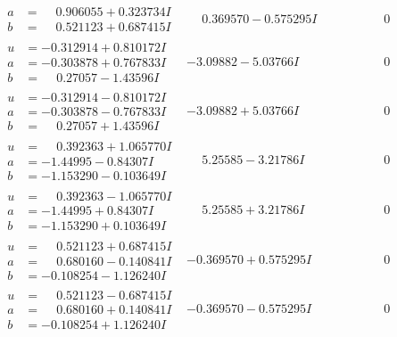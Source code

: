 \documentclass[1p]{elsarticle_modified}
\theoremstyle{definition}
\begin{document}
$$\begin{array}{c|c|c}
\begin{aligned}
a &= \phantom{-}0.906055 + 0.323734 I \\
b &= \phantom{-}0.521123 + 0.687415 I\end{aligned}
 & \phantom{-}0.369570 - 0.575295 I & \phantom{-0.000000 } 0 \\ \hline\begin{aligned}
u &= -0.312914 + 0.810172 I \\
a &= -0.303878 + 0.767833 I \\
b &= \phantom{-}0.27057 - 1.43596 I\end{aligned}
 & -3.09882 - 5.03766 I & \phantom{-0.000000 } 0 \\ \hline\begin{aligned}
u &= -0.312914 - 0.810172 I \\
a &= -0.303878 - 0.767833 I \\
b &= \phantom{-}0.27057 + 1.43596 I\end{aligned}
 & -3.09882 + 5.03766 I & \phantom{-0.000000 } 0 \\ \hline\begin{aligned}
u &= \phantom{-}0.392363 + 1.065770 I \\
a &= -1.44995 - 0.84307 I \\
b &= -1.153290 - 0.103649 I\end{aligned}
 & \phantom{-}5.25585 - 3.21786 I & \phantom{-0.000000 } 0 \\ \hline\begin{aligned}
u &= \phantom{-}0.392363 - 1.065770 I \\
a &= -1.44995 + 0.84307 I \\
b &= -1.153290 + 0.103649 I\end{aligned}
 & \phantom{-}5.25585 + 3.21786 I & \phantom{-0.000000 } 0 \\ \hline\begin{aligned}
u &= \phantom{-}0.521123 + 0.687415 I \\
a &= \phantom{-}0.680160 - 0.140841 I \\
b &= -0.108254 - 1.126240 I\end{aligned}
 & -0.369570 + 0.575295 I & \phantom{-0.000000 } 0 \\ \hline\begin{aligned}
u &= \phantom{-}0.521123 - 0.687415 I \\
a &= \phantom{-}0.680160 + 0.140841 I \\
b &= -0.108254 + 1.126240 I\end{aligned}
 & -0.369570 - 0.575295 I & \phantom{-0.000000 } 0\\

\end{array}$$
\end{document}
